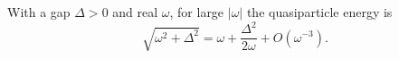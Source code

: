 \documentclass{article}
\begin{document}
With a gap $\Delta>0$ and real $\omega$, for large $|\omega|$ the quasiparticle energy is
\begin{equation}
\sqrt{\omega^2+\Delta^2} = \omega + \frac{\Delta^2}{2\omega} + O(\omega^{-3}) .
\label{eq:tail}
\end{equation}
\end{document}
